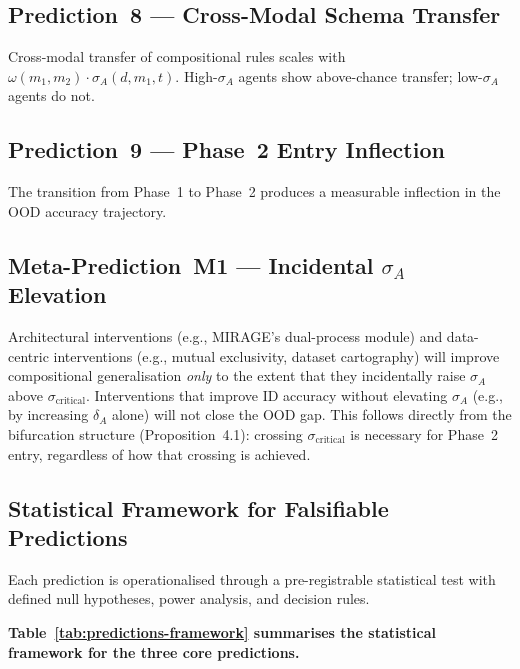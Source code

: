 \documentclass[11pt,a4paper]{article}
\begin{document}
\subsection{Prediction~8 --- Cross-Modal Schema Transfer}
Cross-modal transfer of compositional rules scales with
$\omega(m_1, m_2) \cdot \sigma_A(d, m_1, t)$. High-$\sigma_A$ agents
show above-chance transfer; low-$\sigma_A$ agents do not.

\subsection{Prediction~9 --- Phase~2 Entry Inflection}
The transition from Phase~1 to Phase~2 produces a measurable inflection
in the OOD accuracy trajectory.

\subsection{Meta-Prediction~M1 --- Incidental \texorpdfstring{$\sigma_A$}{sigma\_A} Elevation}\label{sec:meta-M1}
Architectural interventions (e.g., MIRAGE's dual-process module) and
data-centric interventions (e.g., mutual exclusivity, dataset
cartography) will improve compositional generalisation \emph{only}
to the extent that they incidentally raise $\sigma_A$ above
$\sigma_{\mathrm{critical}}$.  Interventions that improve ID accuracy
without elevating $\sigma_A$ (e.g., by increasing $\delta_A$ alone)
will not close the OOD gap.  This follows directly from the
bifurcation structure (Proposition~4.1): crossing
$\sigma_{\mathrm{critical}}$ is necessary for Phase~2 entry, regardless
of how that crossing is achieved.

\subsection{Statistical Framework for Falsifiable Predictions}\label{sec:statistical-framework}

Each prediction is operationalised through a pre-registrable statistical
test with defined null hypotheses, power analysis, and decision rules.

\textbf{Table~\ref{tab:predictions-framework} summarises the statistical
framework for the three core predictions.}
\end{document}
